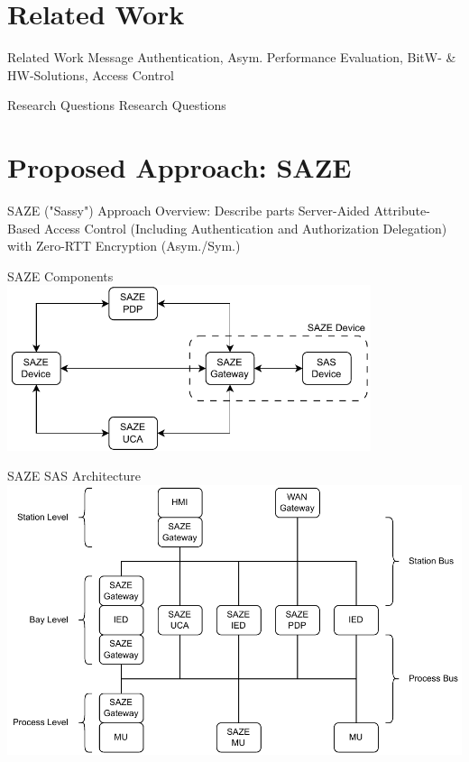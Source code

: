 \documentclass[en]{sdqbeamer}
\begin{document}
\section{Related Work}
\begin{frame}{Related Work}
    Message Authentication, Asym. Performance Evaluation, BitW- \& HW-Solutions, Access Control
\end{frame}

\begin{frame}{Research Questions}
    Research Questions
\end{frame}

\section{Proposed Approach: SAZE}
\begin{frame}{SAZE ("Sassy") Approach}
    Overview: Describe parts Server-Aided Attribute-Based Access Control (Including Authentication and Authorization Delegation) with Zero-RTT Encryption (Asym./Sym.)
\end{frame}

\begin{frame}{SAZE Components}
    \centering
	\includegraphics[width=0.8\textwidth]{./figures/saze_components.drawio.pdf}
\end{frame}

\begin{frame}{SAZE SAS Architecture}
    \centering
    \includegraphics[height=0.75\textheight]{./figures/saze_architecture.drawio.pdf}
\end{frame}
\end{document}
